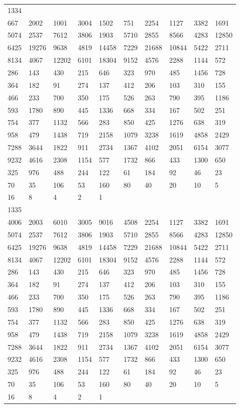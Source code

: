 \begin{longtable}{*{10}{l}}
1334&&&&&&&&&\\
667& 2002& 1001& 3004& 1502& 751& 2254& 1127& 3382& 1691\\
5074& 2537& 7612& 3806& 1903& 5710& 2855& 8566& 4283& 12850\\
6425& 19276& 9638& 4819& 14458& 7229& 21688& 10844& 5422& 2711\\
8134& 4067& 12202& 6101& 18304& 9152& 4576& 2288& 1144& 572\\
286& 143& 430& 215& 646& 323& 970& 485& 1456& 728\\
364& 182& 91& 274& 137& 412& 206& 103& 310& 155\\
466& 233& 700& 350& 175& 526& 263& 790& 395& 1186\\
593& 1780& 890& 445& 1336& 668& 334& 167& 502& 251\\
754& 377& 1132& 566& 283& 850& 425& 1276& 638& 319\\
958& 479& 1438& 719& 2158& 1079& 3238& 1619& 4858& 2429\\
7288& 3644& 1822& 911& 2734& 1367& 4102& 2051& 6154& 3077\\
9232& 4616& 2308& 1154& 577& 1732& 866& 433& 1300& 650\\
325& 976& 488& 244& 122& 61& 184& 92& 46& 23\\
70& 35& 106& 53& 160& 80& 40& 20& 10& 5\\
16& 8& 4& 2& 1& \\

1335&&&&&&&&&\\
4006& 2003& 6010& 3005& 9016& 4508& 2254& 1127& 3382& 1691\\
5074& 2537& 7612& 3806& 1903& 5710& 2855& 8566& 4283& 12850\\
6425& 19276& 9638& 4819& 14458& 7229& 21688& 10844& 5422& 2711\\
8134& 4067& 12202& 6101& 18304& 9152& 4576& 2288& 1144& 572\\
286& 143& 430& 215& 646& 323& 970& 485& 1456& 728\\
364& 182& 91& 274& 137& 412& 206& 103& 310& 155\\
466& 233& 700& 350& 175& 526& 263& 790& 395& 1186\\
593& 1780& 890& 445& 1336& 668& 334& 167& 502& 251\\
754& 377& 1132& 566& 283& 850& 425& 1276& 638& 319\\
958& 479& 1438& 719& 2158& 1079& 3238& 1619& 4858& 2429\\
7288& 3644& 1822& 911& 2734& 1367& 4102& 2051& 6154& 3077\\
9232& 4616& 2308& 1154& 577& 1732& 866& 433& 1300& 650\\
325& 976& 488& 244& 122& 61& 184& 92& 46& 23\\
70& 35& 106& 53& 160& 80& 40& 20& 10& 5\\
16& 8& 4& 2& 1& \\


\end{longtable}
